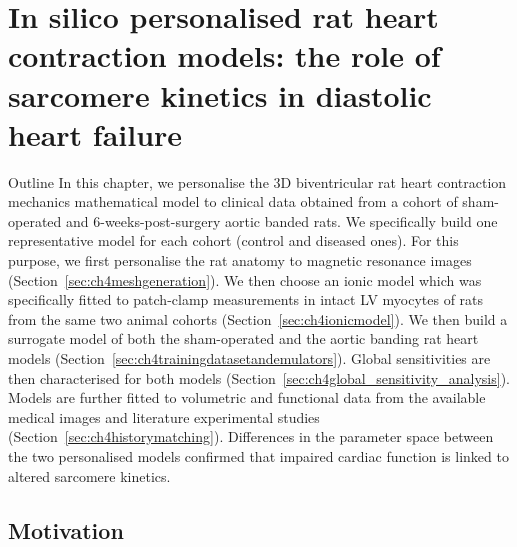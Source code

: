 \chapter{In silico personalised rat heart contraction models: the role of sarcomere kinetics in diastolic heart failure}\label{cha:chapter4}
%
%
%
\begin{remark}{Outline}
    In this chapter, we personalise the $3$D biventricular rat heart contraction mechanics mathematical model to clinical data obtained from a cohort of sham-operated and $6$-weeks-post-surgery aortic banded rats. We specifically build one representative model for each cohort (control and diseased ones). For this purpose, we first personalise the rat anatomy to magnetic resonance images (Section~\ref{sec:ch4meshgeneration}). We then choose an ionic model which was specifically fitted to patch-clamp measurements in intact LV myocytes of rats from the same two animal cohorts (Section~\ref{sec:ch4ionicmodel}). We then build a surrogate model of both the sham-operated and the aortic banding rat heart models (Section~\ref{sec:ch4trainingdatasetandemulators}). Global sensitivities are then characterised for both models (Section~\ref{sec:ch4global_sensitivity_analysis}). Models are further fitted to volumetric and functional data from the available medical images and literature experimental studies (Section~\ref{sec:ch4historymatching}). Differences in the parameter space between the two personalised models confirmed that impaired cardiac function is linked to altered sarcomere kinetics.
\end{remark}


%
%
%
\section{Motivation}\label{sec:ch4motivation}

